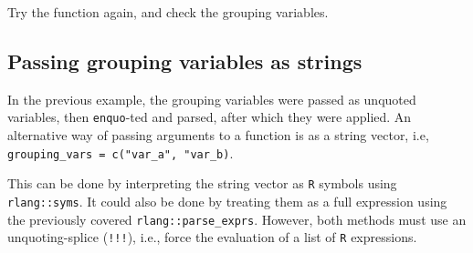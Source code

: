\documentclass[]{book}
\newenvironment{Shaded}{}{}
\newcommand{\CommentTok}[1]{\textcolor[rgb]{0.38,0.63,0.69}{\textit{#1}}}
\newcommand{\ControlFlowTok}[1]{\textcolor[rgb]{0.00,0.44,0.13}{\textbf{#1}}}
\newcommand{\DataTypeTok}[1]{\textcolor[rgb]{0.56,0.13,0.00}{#1}}
\newcommand{\KeywordTok}[1]{\textcolor[rgb]{0.00,0.44,0.13}{\textbf{#1}}}
\newcommand{\NormalTok}[1]{#1}
\newcommand{\OperatorTok}[1]{\textcolor[rgb]{0.40,0.40,0.40}{#1}}
\newcommand{\StringTok}[1]{\textcolor[rgb]{0.25,0.44,0.63}{#1}}
\begin{document}
\begin{Shaded}
\end{Shaded}

Try the function again, and check the grouping variables.

\begin{Shaded}
\end{Shaded}

\hypertarget{passing-grouping-variables-as-strings}{%
\subsection{Passing grouping variables as strings}\label{passing-grouping-variables-as-strings}}

In the previous example, the grouping variables were passed as unquoted variables, then \texttt{enquo}-ted and parsed, after which they were applied.
An alternative way of passing arguments to a function is as a string vector, i.e, \texttt{grouping\_vars\ =\ c("var\_a",\ "var\_b)}.

This can be done by interpreting the string vector as \texttt{R} symbols using \texttt{rlang::syms}. It could also be done by treating them as a full expression using the previously covered \texttt{rlang::parse\_exprs}. However, both methods must use an unquoting-splice (\texttt{!!!}), i.e., force the evaluation of a list of \texttt{R} expressions.
\end{document}
